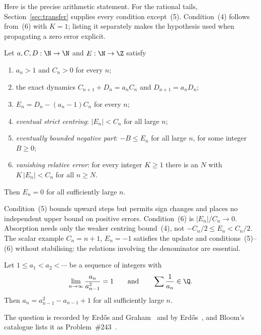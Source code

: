 \documentclass[11pt]{article}
\begin{document}
\begin{samepage}
Here is the precise arithmetic statement. For the rational tails,
Section~\ref{sec:transfer} supplies every condition except~(5).
Condition~(4) follows from~(6) with $K=1$; listing it separately makes
the hypothesis used when propagating a zero error explicit.

\begin{theorem}\label{res:bounded}
Let $a,C,D:\N\to\N$ and $E:\N\to\Z$ satisfy
\begin{enumerate}
\item $a_n>1$ and $C_n>0$ for every $n$;
\item the exact dynamics $C_{n+1}+D_n=a_nC_n$ and $D_{n+1}=a_nD_n$;
\item $E_n=D_n-(a_n-1)C_n$ for every $n$;
\item \emph{eventual strict centring}: $|E_n|<C_n$ for all large $n$;
\item \emph{eventually bounded negative part}: $-B\le E_n$ for all large $n$,
for some integer $B\ge0$;
\item \emph{vanishing relative error}: for every integer $K\ge1$ there is an $N$ with
$K\,|E_n|<C_n$ for all $n\ge N$.
\end{enumerate}
Then $E_n=0$ for all sufficiently large $n$.
\end{theorem}
\end{samepage}

Condition~(5) bounds upward steps but permits sign changes and places no
independent upper bound on positive errors. Condition~(6) is
$|E_n|/C_n\to0$. Absorption needs only the weaker centring bound~(4),
not $-C_n/2\le E_n<C_n/2$. The scalar example $C_n=n+1$, $E_n=-1$
satisfies the update and conditions~(5)--(6) without stabilising:
the relations involving the denominator are essential.


\begin{problem}[Erd\H{o}s \#243]\label{res:problem}
Let $1\le a_1<a_2<\cdots$ be a sequence of integers with
\[
 \lim_{n\to\infty}\frac{a_n}{a_{n-1}^{2}}=1
 \qquad\text{and}\qquad
 \sum\frac{1}{a_n}\in\Q .
\]
Then $a_n=a_{n-1}^{2}-a_{n-1}+1$ for all sufficiently large $n$.
\end{problem}

The question is recorded by Erd\H{o}s and Graham~\cite{erdosgraham1980} and by
Erd\H{o}s~\cite[p.~105]{erdos1988}, and Bloom's catalogue lists it as
Problem~\#243~\cite{erdosproblems}.
\end{document}

